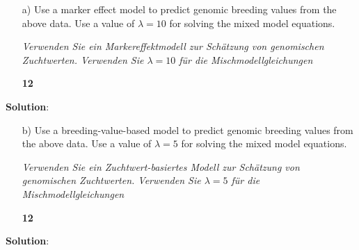 \documentclass[
]{article}
\newcommand{\points}[1]
{\begin{flushright}\textbf{#1}\end{flushright}}
\newcommand{\solstart}
{\vspace{3ex}\textbf{Solution}:}
\begin{document}
\clearpage
\pagebreak

\begin{enumerate}
\item[a)] Use a marker effect model to predict genomic breeding values from the above data. Use a value of $\lambda = 10$ for solving the mixed model equations.

\textit{Verwenden Sie ein Markereffektmodell zur Schätzung von genomischen Zuchtwerten. Verwenden Sie $\lambda = 10$ für die Mischmodellgleichungen}
\points{12}
\end{enumerate}

\solstart

\clearpage
\pagebreak

\begin{enumerate}
\item[b)] Use a breeding-value-based model to predict genomic breeding values from the above data. Use a value of $\lambda = 5$ for solving the mixed model equations.

\textit{Verwenden Sie ein Zuchtwert-basiertes Modell zur Schätzung von genomischen Zuchtwerten. Verwenden Sie $\lambda = 5$ für die Mischmodellgleichungen}
\points{12}
\end{enumerate}

\solstart
\end{document}
